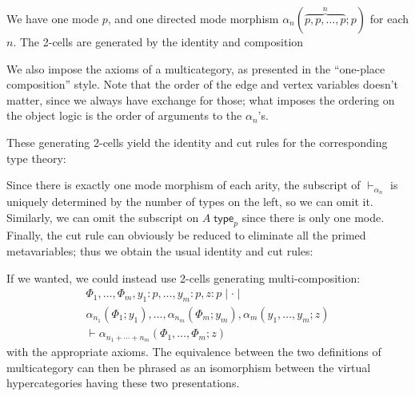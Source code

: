 \documentclass{article}
\theoremstyle{definition}
\theoremstyle{remark}
\def\type{\;\mathsf{type}}
\let\types\vdash
\begin{document}
We have one mode $p$, and one directed mode morphism $\alpha_n(\overbrace{p,p,\dots,p}^n;p)$ for each $n$.
The 2-cells are generated by the identity and composition
We also impose the axioms of a multicategory, as presented in the ``one-place composition'' style.
Note that the order of the edge and vertex variables doesn't matter, since we always have exchange for those; what imposes the ordering on the object logic is the order of arguments to the $\alpha_n$'s.

These generating 2-cells yield the identity and cut rules for the corresponding type theory:
Since there is exactly one mode morphism of each arity, the subscript of $\types_{\alpha_n}$ is uniquely determined by the number of types on the left, so we can omit it.
Similarly, we can omit the subscript on $A\type_p$ since there is only one mode.
Finally, the cut rule can obviously be reduced to eliminate all the primed metavariables; thus we obtain the usual identity and cut rules:

If we wanted, we could instead use 2-cells generating multi-composition:
\begin{multline*}
  \Phi_1,\dots,\Phi_m,y_1:p,\dots,y_m:p,z:p \mid\cdot\mid\\
  \alpha_{n_1}(\Phi_1;y_1),\dots,\alpha_{n_m}(\Phi_m;y_m), \alpha_m(y_1,\dots,y_m;z)\\
  \types \alpha_{n_1+\cdots+n_m}(\Phi_1,\dots,\Phi_m;z)
\end{multline*}
with the appropriate axioms.
The equivalence between the two definitions of multicategory can then be phrased as an isomorphism between the virtual hypercategories having these two presentations.
\end{document}
